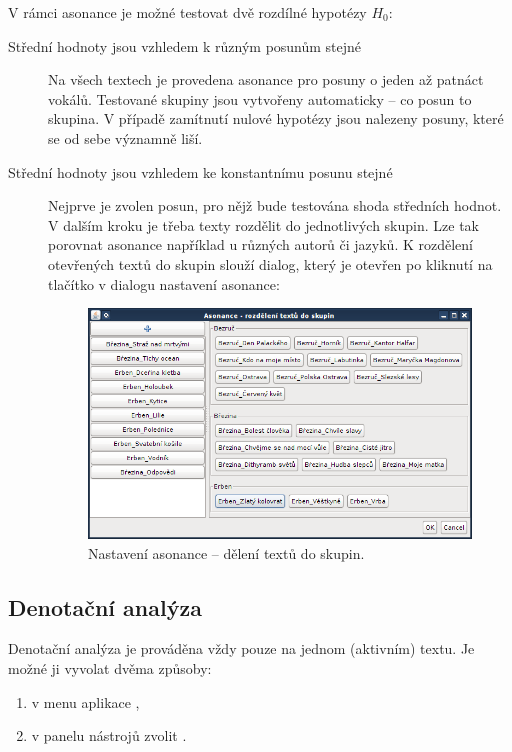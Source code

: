 \documentclass[dp.tex]{subfiles}
\begin{document}
V rámci asonance je možné testovat dvě rozdílné hypotézy $H_0$:
\begin{description}
\item[Střední hodnoty jsou vzhledem k různým posunům stejné] Na všech textech je provedena asonance pro posuny o jeden až patnáct vokálů. Testované skupiny jsou vytvořeny automaticky -- co posun to skupina. V případě zamítnutí nulové hypotézy jsou nalezeny posuny, které se od sebe významně liší. 

\item[Střední hodnoty jsou vzhledem ke konstantnímu posunu stejné] Nejprve je zvolen posun, pro nějž bude testována shoda středních hodnot. V dalším kroku je třeba texty rozdělit do jednotlivých skupin. Lze tak porovnat asonance například u různých autorů či jazyků. K rozdělení otevřených textů do skupin slouží dialog, který je otevřen po kliknutí na tlačítko  v dialogu nastavení asonance:
\begin{figure}[H]
\centering
\includegraphics[max width=\textwidth,keepaspectratio=true]{imgs-60-aplikace/gui-asonance-settings-groups}
\caption{Nastavení asonance -- dělení textů do skupin.}
\label{fig:gui-asonance-settings-groups}
\end{figure}

\end{description}


\subsection{Denotační analýza}

Denotační analýza je prováděna vždy pouze na jednom (aktivním) textu. Je možné ji vyvolat dvěma způsoby:

\begin{enumerate}
\item v menu aplikace ,
\item v panelu nástrojů zvolit .
\\
\end{enumerate}
\end{document}
